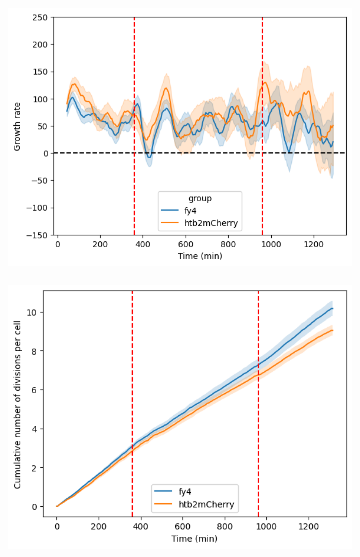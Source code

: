 \begin{figure}
  \centering
  \begin{subfigure}[htpb]{0.45\textwidth}
   \centering
   \includegraphics[width=\textwidth]{allstrains_613_gr}
   \caption{
   }
   \label{fig:biology-kdeficient-gr}
  \end{subfigure}%
  \begin{subfigure}[htpb]{0.45\textwidth}
   \centering
   \includegraphics[width=\textwidth]{allstrains_613_cumul}
   \caption{
   }
   \label{fig:biology-kdeficient-cumul}
  \end{subfigure}


\end{figure}
